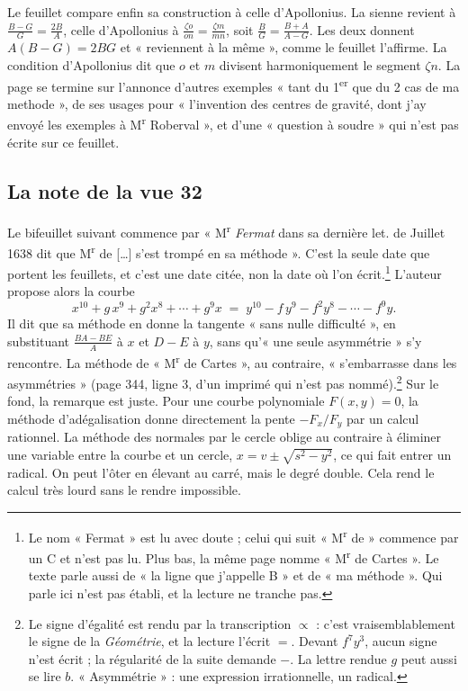 \documentclass[11pt,a4paper]{article}
\begin{document}
Le feuillet compare enfin sa construction à celle d'Apollonius. La sienne
revient à \(\frac{B-G}{G}=\frac{2B}{A}\), celle d'Apollonius à
\(\frac{\zeta o}{on}=\frac{\zeta m}{mn}\), soit \(\frac{B}{G}=\frac{B+A}{A-G}\).
Les deux donnent \(A(B-G)=2BG\) et « reviennent à la même », comme le feuillet
l'affirme. La condition d'Apollonius dit que \(o\) et \(m\) divisent
harmoniquement le segment \(\zeta n\). La page se termine sur l'annonce d'autres
exemples « tant du 1\textsuperscript{er} que du 2 cas de ma methode », de ses
usages pour « l'invention des centres de gravité, dont j'ay envoyé les exemples
à M\textsuperscript{r} Roberval », et d'une « question à soudre » qui n'est pas
écrite sur ce feuillet.

\subsection*{La note de la vue 32}

Le bifeuillet suivant commence par « M\textsuperscript{r} \emph{Fermat} dans sa
dernière let. de Juillet 1638 dit que M\textsuperscript{r} de [\ldots] s'est
trompé en sa méthode ». C'est la seule date que portent les feuillets, et c'est
une date citée, non la date où l'on écrit.\footnote{Le nom « Fermat » est lu
avec doute ; celui qui suit « M\textsuperscript{r} de » commence par un C et
n'est pas lu. Plus bas, la même page nomme « M\textsuperscript{r} de Cartes ».
Le texte parle aussi de « la ligne que j'appelle B » et de « ma méthode ».
Qui parle ici n'est pas établi, et la lecture ne tranche pas.} L'auteur
propose alors la courbe
\[
x^{10}+g\,x^{9}+g^{2}x^{8}+\cdots+g^{9}x \;=\; y^{10}-f\,y^{9}-f^{2}y^{8}-\cdots-f^{9}y .
\]
Il dit que sa méthode en donne la tangente « sans nulle difficulté », en
substituant \(\frac{BA-BE}{A}\) à \(x\) et \(D-E\) à \(y\), sans qu'« une seule
asymmétrie » s'y rencontre. La méthode de « M\textsuperscript{r} de Cartes »,
au contraire, « s'embarrasse dans les asymmétries » (page 344, ligne 3, d'un
imprimé qui n'est pas nommé).\footnote{Le signe d'égalité est rendu par la
transcription \(\propto\) : c'est vraisemblablement le signe de la
\emph{Géométrie}, et la lecture l'écrit \(=\). Devant \(f^{7}y^{3}\), aucun
signe n'est écrit ; la régularité de la suite demande \(-\). La lettre rendue
\(g\) peut aussi se lire \(b\). « Asymmétrie » : une expression irrationnelle,
un radical.} Sur le fond, la remarque est juste. Pour une courbe polynomiale
\(F(x,y)=0\), la méthode d'adégalisation donne directement la pente
\(-F_x/F_y\) par un calcul rationnel. La méthode des normales par le cercle
oblige au contraire à éliminer une variable entre la courbe et un cercle,
\(x=v\pm\sqrt{s^2-y^2}\), ce qui fait entrer un radical. On peut l'ôter en
élevant au carré, mais le degré double. Cela rend le calcul très lourd sans le
rendre impossible.
\end{document}
